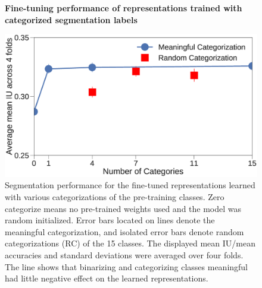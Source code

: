 
\begin{figure}[t]
\centering
\textbf{Fine-tuning performance of representations trained with categorized segmentation labels}\par\medskip
   \includegraphics[width=1.\linewidth]{img/num_classes.eps}
\caption{
Segmentation performance for the fine-tuned representations learned with various categorizations of the pre-training classes.
Zero categorize means no pre-trained weights used and the model was random initialized.
Error bars located on lines denote the meaningful categorization, and isolated error bars denote random categorizations (RC) of the 15 classes.
The displayed mean IU/mean accuracies and standard deviations were averaged over four folds.
The line shows that binarizing and categorizing classes meaningful had little negative effect on the learned representations.
}
\label{fig:categories}
\end{figure}



